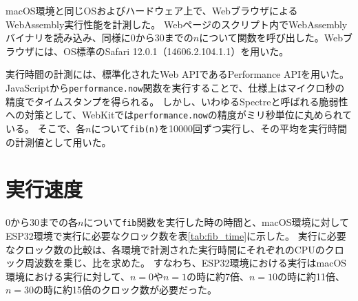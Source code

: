 macOS環境と同じOSおよびハードウェア上で、WebブラウザによるWebAssembly実行性能を計測した。
Webページのスクリプト内でWebAssemblyバイナリを読み込み、同様に0から30までの$n$について関数を呼び出した。Webブラウザには、OS標準のSafari 12.0.1（14606.2.104.1.1）を用いた。

実行時間の計測には、標準化されたWeb APIであるPerformance APIを用いた。
JavaScriptから\verb|performance.now|関数を実行することで、仕様上はマイクロ秒の精度でタイムスタンプを得られる。
しかし、いわゆるSpectreと呼ばれる脆弱性への対策として、WebKitでは\verb|performance.now|の精度がミリ秒単位に丸められている\cite{webkit_spectre}\cite{webkit_trac}。
そこで、各$n$について\verb|fib(n)|を10000回ずつ実行し、その平均を実行時間の計測値として用いた。

\newpage

\section{実行速度}

0から30までの各$n$について\verb|fib|関数を実行した時の時間と、macOS環境に対してESP32環境で実行に必要なクロック数を表\ref{tab:fib_time}に示した。
実行に必要なクロック数の比較は、各環境で計測された実行時間にそれぞれのCPUのクロック周波数を乗じ、比を求めた。
すなわち、ESP32環境における実行はmacOS環境における実行に対して、$n=0$や$n=1$の時に約7倍、$n=10$の時に約11倍、$n=30$の時に約15倍のクロック数が必要だった。

